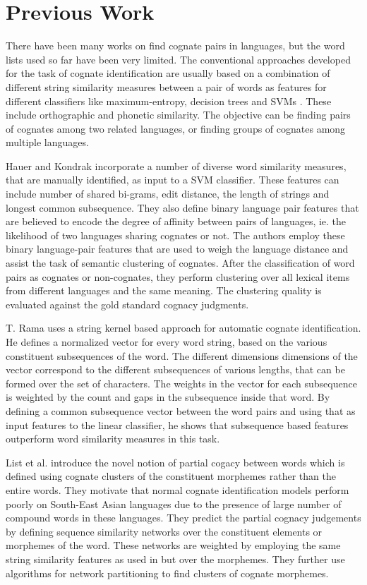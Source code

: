 \chapter{Previous Work}

There have been many works on find cognate pairs in languages, but the word lists used so far have been very limited. The conventional approaches developed for the task of cognate identification are usually based on a combination of different string similarity measures between a pair of words as features for different classifiers like maximum-entropy, decision trees and SVMs \cite{inkpen2005automatic}\cite{bergsma2007alignment}. These include orthographic and phonetic similarity. The objective can be finding pairs of cognates among two related languages, or finding groups of cognates among multiple languages.

Hauer and Kondrak \cite{hauer2011clustering} incorporate a number of diverse word similarity measures, that are manually identified, as input to a SVM classifier. These features can include number of shared bi-grams, edit distance, the length of strings and longest common subsequence. They also define binary language pair features that are believed to encode the degree of affinity between pairs of languages, ie. the likelihood of two languages sharing cognates or not. The authors employ these binary language-pair features that are used to weigh the language distance and assist the task of semantic clustering of cognates. After the classification of word pairs as cognates or non-cognates, they perform clustering over all lexical items from different languages and the same meaning. The clustering quality is evaluated against the gold standard cognacy judgments.

T. Rama \cite{rama2015automatic} uses a string kernel based approach for automatic cognate identification. He defines  a normalized vector for every word string, based on the various constituent subsequences of the word. The different dimensions dimensions of the vector correspond to the different subsequences of various lengths, that can be formed over the set of characters. The weights in the vector for each subsequence is weighted by the count and gaps in the subsequence inside that word. By defining a common subsequence vector between the word pairs and using that as input features to the linear classifier, he shows that subsequence based features outperform word similarity measures in this task.

List et al. \cite{listusing} introduce the novel notion of partial cogacy between words which is defined using cognate clusters of the constituent morphemes rather than the entire words. They motivate that normal cognate identification models perform poorly on South-East Asian languages due to the presence of large number of compound words in these languages. They predict the partial cognacy judgements by defining sequence similarity networks over the constituent elements or morphemes of the word. These networks are weighted by employing the same string similarity features as used in \cite{hauer2011clustering} but over the morphemes. They further use algorithms for network partitioning to find clusters of cognate morphemes.

